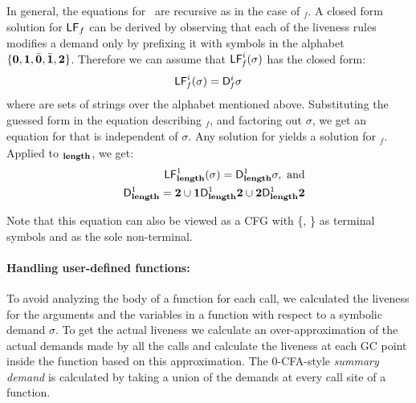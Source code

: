 \documentclass[9pt,preprint,letter,nonatbib]{sigplanconf}
\begin{document}
In general, the equations for \Lfonly\ are recursive as in the case of
\Lfonly$_\mathit{f}$. A closed  form solution for $\mathsf{LF}_{\mathit \mathit{f}}$
can be derived by observing that each of the liveness rules modifies a
demand  only by  prefixing it  with symbols  in the  alphabet $\lbrace
\mathbf{0}, \mathbf{1},\bar{\mathbf{0}},  \bar{\mathbf{1}}, {\mathbf{2}}  \rbrace$. Therefore we  can assume
that $\mathsf{LF}_{\mathit f}^{i}( {\mathit \sigma})$ has the closed form:
\begin{eqnarray}
\label{eq:LF:DI}
  \mathsf{LF}_{\mathit f}^{i}( {\mathit \sigma}) = \mathsf{D}_{\mathit f}^{i}\sigma
\end{eqnarray}
where   are sets of strings  over the alphabet
mentioned above.  Substituting the  guessed form in the
equation   describing    \Lfonly$_{\mathit   f}$,   and
factoring  out   $\sigma$,  we  get  an   equation  for
  that   is  independent  of   $\sigma$.   Any
solution   for      yields  a   solution   for
\Lfonly$_{\mathit  f}$.   Applied to  \Lfonly$_{\mathit
  {\mathbf{length}}}$, we get:
  \begin{eqnarray*}
&&  \mathsf{LF}_{\mathit {\mathbf{length}} }^{1}( {\mathit \sigma}) = \mathsf{D}_{\mathit {\mathbf{length}}}^{1}\sigma,~\mbox{and}\\
&&   \mathsf{D}_{\mathit {\mathbf{length}}}^{1} = {\mathbf{2}} \cup \mathbf{1}\mathsf{D}_{\mathit {\mathbf{length}}}^{1}{\mathbf{2}}
       \cup {\mathbf{2}}\mathsf{D}_{\mathit {\mathbf{length}}}^{1}{{\mathbf{2}}}
  \end{eqnarray*}

Note that this equation can also be viewed as a CFG with \{\acdr,
\clazy\} as terminal symbols and  as the sole
non-terminal.

\paragraph{Handling user-defined functions:}
\label{sec:bodylivenessbodies}
To  avoid analyzing  the body  of a  function for  each
call, we calculated the  liveness for the arguments and
the variables in a function  with respect to a symbolic
demand  $\sigma$.   To  get   the  actual  liveness  we
calculate an  over-approximation of the  actual demands
made by  all the  calls and  calculate the  liveness at
each  GC  point  inside  the  function  based  on  this
approximation.  The 0-CFA-style {\em summary demand} is
calculated by  taking a union  of the demands  at every
call site of a function.
\end{document}
